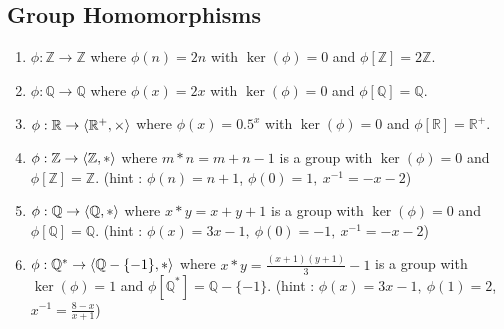 \subsection{Group Homomorphisms}
\begin{enumerate}
	\item $\phi : \mathbb{Z} \to \mathbb{Z}$ where $\phi(n)=2n$ with $\ker(\phi) = 0$ and $\phi[\mathbb{Z}] = 2\mathbb{Z}$.
	\item $\phi : \mathbb{Q} \to \mathbb{Q}$ where $\phi(x)=2x$ with $\ker(\phi) = 0$ and $\phi[\mathbb{Q}] = \mathbb{Q}$.
	\item $\phi : \mathbb{R} \to \left\langle \mathbb{R}^+,\times \right\rangle$ where $\phi(x)=0.5^x$ with $\ker(\phi) = 0$ and $\phi[\mathbb{R}] = \mathbb{R}^+$.
	\item $\phi : \mathbb{Z} \to \left\langle \mathbb{Z},\ast \right\rangle$ where $m \ast n = m+n-1 $ is a group with $\ker(\phi) = 0$ and $\phi[\mathbb{Z}] = \mathbb{Z}$.
		(hint : $\phi(n) = n+1$, $\phi(0) = 1,\ x^{-1} = -x-2$)
	\item $\phi : \mathbb{Q} \to \left\langle \mathbb{Q},\ast \right\rangle$ where $x \ast y =  x+y+1$ is a group with $\ker(\phi) = 0$ and $\phi[\mathbb{Q}] = \mathbb{Q}$.
		(hint : $\phi(x) = 3x-1,\ \phi(0) = -1,\ x^{-1} = -x-2$)
	\item $\phi : \mathbb{Q}^\ast \to \left\langle \mathbb{Q}-\{-1\},\ast \right\rangle$ where $x \ast y =  \frac{(x+1)(y+1)}{3}-1$ is a group with $\ker(\phi) = 1$ and $\phi[\mathbb{Q}^\ast] = \mathbb{Q}-\{-1\}$.
		(hint : $\phi(x) = 3x-1,\ \phi(1)=2$,\ $x^{-1} = \frac{8-x}{x+1}$)
\end{enumerate}

